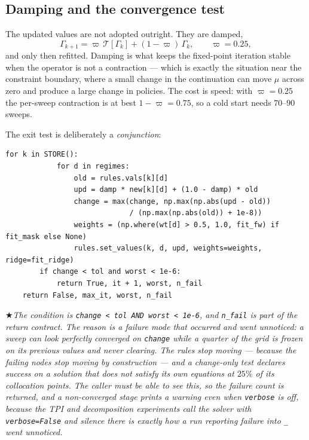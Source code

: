 \documentclass[11pt]{article}
\numberwithin{equation}{section}
\newcommand{\code}[1]{\texttt{\small #1}}
\theoremstyle{definition}
\theoremstyle{plain}
\theoremstyle{remark}
\newcommand{\warn}[1]{\par\smallskip\noindent
  \textcolor{red!60!black}{$\bigstar$}\;\emph{#1}\par\smallskip}
\begin{document}
\subsection{Damping and the convergence test}

The updated values are not adopted outright. They are damped,
\begin{equation}
\Gamma_{k+1}=\varpi\,\mathcal{T}[\Gamma_k]+(1-\varpi)\,\Gamma_k,
\qquad \varpi=0.25,
\label{eq:damping}
\end{equation}
and only then refitted. Damping is what keeps the fixed-point iteration stable when
the operator is not a contraction --- which is exactly the situation near the
constraint boundary, where a small change in the continuation can move $\mu$ across
zero and produce a large change in policies. The cost is speed: with $\varpi=0.25$ the
per-sweep contraction is at best $1-\varpi=0.75$, so a cold start needs $70$--$90$
sweeps.

The exit test is deliberately a \emph{conjunction}:

\begin{lstlisting}[caption={Damping, refit and the two-part exit test. \code{recursive\_main.py}, \code{time\_iteration}.}]
        for k in STORE():
            for d in regimes:
                old = rules.vals[k][d]
                upd = damp * new[k][d] + (1.0 - damp) * old
                change = max(change, np.max(np.abs(upd - old))
                             / (np.max(np.abs(old)) + 1e-8))
                weights = (np.where(wt[d] > 0.5, 1.0, fit_fw) if fit_mask else None)
                rules.set_values(k, d, upd, weights=weights, ridge=fit_ridge)
        if change < tol and worst < 1e-6:
            return True, it + 1, worst, n_fail
    return False, max_it, worst, n_fail
\end{lstlisting}

\warn{The condition is \code{change < tol AND worst < 1e-6}, and \code{n\_fail} is
part of the return contract. The reason is a failure mode that occurred and went
unnoticed: a sweep can look perfectly converged on \code{change} while a quarter of
the grid is \emph{frozen} on its previous values and never clearing. The rules stop
moving --- because the failing nodes stop moving by construction --- and a
change-only test declares success on a solution that does not satisfy its own
equations at $25\%$ of its collocation points. The caller must be able to see this,
so the failure count is returned, and a non-converged stage prints a warning
\emph{even when \code{verbose} is off}, because the TPI and decomposition experiments
call the solver with \code{verbose=False} and silence there is exactly how a run
reporting failure into \code{\_} went unnoticed.}
\end{document}
